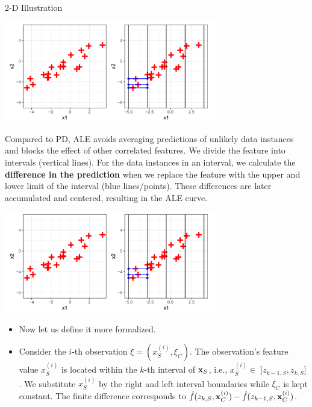 \documentclass[11pt,compress,t,notes=noshow, xcolor=table]{beamer}
\begin{document}
\begin{vbframe}{2-D Illustration}

\begin{center}
\includegraphics[width=0.7\textwidth]{figure_man/2D01.png}
\end{center}

Compared to PD, ALE avoids averaging predictions of unlikely data instances and blocks the effect of other correlated features. We divide the feature into intervals (vertical lines). For the data instances in an interval, we calculate the \textbf{difference in the prediction} when we replace the feature with the upper and lower limit of the interval (blue lines/points). These differences are later accumulated and centered, resulting in the ALE curve.

\framebreak

\begin{center}
\includegraphics[width=0.7\textwidth]{figure_man/2D01.png}
\end{center}


 \begin{itemize}
  \item Now let us define it more formalized.
  \item  Consider the $i$-th observation $\xi = (x_S^{(i)}, \xi_C)$. The observation's feature value $x_S^{(i)}$ is located within the $k$-th interval of $\xv_S$, i.e., $x_S^{(i)} \in \; ]z_{k-1, S}, z_{k, S}]$. We substitute $x_S^{(i)}$ by the right and left interval boundaries while $\xi_C$ is kept constant. The finite difference corresponds to $\fh(z_{k, S}, \xi_C) - \fh(z_{k-1, S}, \xi_C)$.
\end{itemize}



\end{vbframe}
\end{document}
